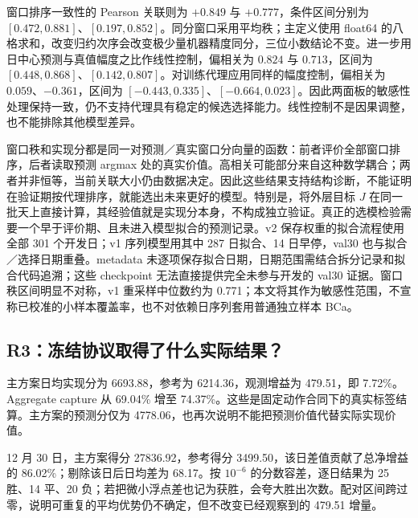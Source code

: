 \documentclass[11pt,a4paper]{article}
\begin{document}
窗口排序一致性的 Pearson 关联则为 $+0.849$ 与 $+0.777$，条件区间分别为 $[0.472,0.881]$、$[0.197,0.852]$。同分窗口采用平均秩；主定义使用 float64 的八格求和，改变归约次序会改变极少量机器精度同分，三位小数结论不变。进一步用日中心预测与真值幅度之比作线性控制，偏相关为 $0.824$ 与 $0.713$，区间为 $[0.448,0.868]$、$[0.142,0.807]$。对训练代理应用同样的幅度控制，偏相关为 $0.059$、$-0.361$，区间为 $[-0.443,0.335]$、$[-0.664,0.023]$。因此两面板的敏感性处理保持一致，仍不支持代理具有稳定的候选选择能力。线性控制不是因果调整，也不能排除其他模型差异。

窗口秩和实现分都是同一对预测／真实窗口分向量的函数：前者评价全部窗口排序，后者读取预测 argmax 处的真实价值。高相关可能部分来自这种数学耦合；两者并非恒等，当前关联大小仍由数据决定。因此这些结果支持结构诊断，不能证明在验证期按代理排序，就能选出未来更好的模型。特别是，将外层目标 $J$ 在同一批天上直接计算，其经验值就是实现分本身，不构成独立验证。真正的选模检验需要一个早于评价期、且未进入模型拟合的预测记录。v2 保存权重的拟合流程使用全部 301 个开发日；v1 序列模型用其中 287 日拟合、14 日早停，val30 也与拟合／选择日期重叠。metadata 未逐项保存拟合日期，日期范围需结合拆分记录和拟合代码追溯；这些 checkpoint 无法直接提供完全未参与开发的 val30 证据。窗口秩区间明显不对称，v1 重采样中位数约为 0.771；本文将其作为敏感性范围，不宣称已校准的小样本覆盖率，也不对依赖日序列套用普通独立样本 BCa。

\FloatBarrier
\subsection{R3：冻结协议取得了什么实际结果？}

主方案日均实现分为 6693.88，参考为 6214.36，观测增益为 479.51，即 7.72\%。Aggregate capture 从 69.04\% 增至 74.37\%。这些是固定动作合同下的真实标签结算。主方案的预测分仅为 4778.06，也再次说明不能把预测价值代替实际实现价值。


12 月 30 日，主方案得分 27836.92，参考得分 3499.50，该日差值贡献了总净增益的 86.02\%；剔除该日后日均差为 68.17。按 $10^{-6}$ 的分数容差，逐日结果为 25 胜、14 平、20 负；若把微小浮点差也记为获胜，会夸大胜出次数。配对区间跨过零，说明可重复的平均优势仍不确定，但不改变已经观察到的 479.51 增量。
\end{document}
